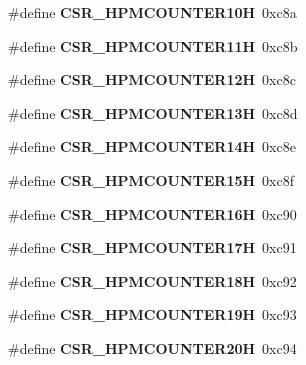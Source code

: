 \begin{DoxyCompactItemize}
\#define {\bfseries C\+S\+R\+\_\+\+H\+P\+M\+C\+O\+U\+N\+T\+E\+R10H}~0xc8a
\item 
\mbox{\label{riscv-utility_8h_aea60788a08d7b4ca7b53f420f603a379}} 
\#define {\bfseries C\+S\+R\+\_\+\+H\+P\+M\+C\+O\+U\+N\+T\+E\+R11H}~0xc8b
\item 
\mbox{\label{riscv-utility_8h_a2c0f3bb461cf96900abe0cb838ecdd98}} 
\#define {\bfseries C\+S\+R\+\_\+\+H\+P\+M\+C\+O\+U\+N\+T\+E\+R12H}~0xc8c
\item 
\mbox{\label{riscv-utility_8h_ac3a0bbad16bd85e6c94ae660c3385bf3}} 
\#define {\bfseries C\+S\+R\+\_\+\+H\+P\+M\+C\+O\+U\+N\+T\+E\+R13H}~0xc8d
\item 
\mbox{\label{riscv-utility_8h_a7652fab822b65fe3a34c6d9276e79be5}} 
\#define {\bfseries C\+S\+R\+\_\+\+H\+P\+M\+C\+O\+U\+N\+T\+E\+R14H}~0xc8e
\item 
\mbox{\label{riscv-utility_8h_a24960fa447bc0b97490e89affaf12175}} 
\#define {\bfseries C\+S\+R\+\_\+\+H\+P\+M\+C\+O\+U\+N\+T\+E\+R15H}~0xc8f
\item 
\mbox{\label{riscv-utility_8h_a9f41e6d2a9a3ef8658ffb75ba556850d}} 
\#define {\bfseries C\+S\+R\+\_\+\+H\+P\+M\+C\+O\+U\+N\+T\+E\+R16H}~0xc90
\item 
\mbox{\label{riscv-utility_8h_a6085cb84939839a52d2d39a9fc3eda31}} 
\#define {\bfseries C\+S\+R\+\_\+\+H\+P\+M\+C\+O\+U\+N\+T\+E\+R17H}~0xc91
\item 
\mbox{\label{riscv-utility_8h_a6b5ff85ac4148e421faf6ddf54ac4a9c}} 
\#define {\bfseries C\+S\+R\+\_\+\+H\+P\+M\+C\+O\+U\+N\+T\+E\+R18H}~0xc92
\item 
\mbox{\label{riscv-utility_8h_a2d88e7749d8af48f14354828ef7d035b}} 
\#define {\bfseries C\+S\+R\+\_\+\+H\+P\+M\+C\+O\+U\+N\+T\+E\+R19H}~0xc93
\item 
\mbox{\label{riscv-utility_8h_aa650b0fc0f2bb0961c67fbf7b4c36600}} 
\#define {\bfseries C\+S\+R\+\_\+\+H\+P\+M\+C\+O\+U\+N\+T\+E\+R20H}~0xc94
\item 

\end{DoxyCompactItemize}
